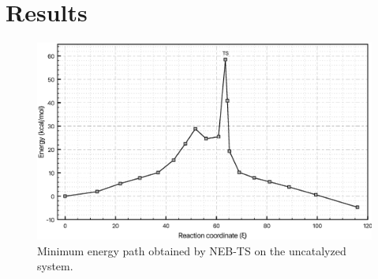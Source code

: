 \section{Results}
\label{sec:results}

\begin{figure}[h]
    \centering
    \includegraphics[width=0.85\linewidth]{figures/MEP_r2SCAN_R1.eps}
    \caption{Minimum energy path obtained by NEB-TS on the uncatalyzed system.}
\end{figure}